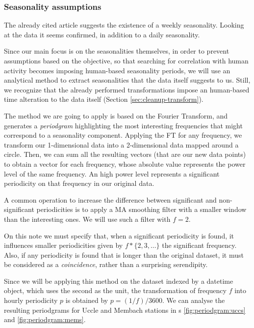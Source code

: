 \documentclass[12pt]{article}
\begin{document}
\subsubsection{Seasonality assumptions}
The already cited article \cite{NatureCoronavirusSeismic} suggests the existence of a weekly seasonality. Looking at the data it seems confirmed, in addition to a daily seasonality.

Since our main focus is on the seasonalities themselves, in order to prevent assumptions based on the objective, so that searching for correlation with human activity becomes imposing human-based seasonality periods, we will use an analytical method to extract seasonalities that the data itself suggests to us. Still, we recognize that the already performed transformations impose an human-based time alteration to the data itself (Section \ref{sec:cleanup-transform}).

The method we are going to apply is based on the Fourier Transform, and generates a \textit{periodgram} highlighting the most interesting frequencies that might correspond to a seasonality component.
Applying the FT for any frequency, we transform our 1-dimensional data into a 2-dimensional data mapped around a circle. Then, we can sum all the resulting vectors (that are our new data points) to obtain a vector for each frequency, whose absolute value represents the power level of the same frequency. An high power level represents a significant periodicity on that frequency in our original data.

A common operation to increase the difference between significant and non-significant periodicities is to apply a MA smoothing filter with a smaller window than the interesting ones. We will use such a filter with $f=2$.

On this note we must specify that, when a significant periodicity is found, it influences smaller periodicities given by $f*\{2,3,\dots\}$ the significant frequency. Also, if any periodicity is found that is longer than the original dataset, it must be considered as a \textit{coincidence}, rather than a surprising serendipity.

Since we will be applying this method on the dataset indexed by a datetime object, which uses the second as the unit, the transformation of frequency $f$ into hourly periodicity $p$ is obtained by $p=(1/f)/3600$.
We can analyse the resulting periodgrams for Uccle and Membach stations in \figurename{s} \ref{fig:periodgram:uccs} and \ref{fig:periodgram:mems}.
\end{document}
